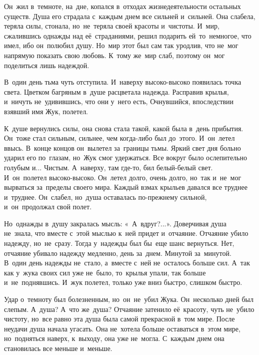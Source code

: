Он~жил в~темноте, на~дне, копался в~отходах жизнедеятельности остальных существ.
Душа его страдала с~каждым днем все сильней и~сильней.
Она слабела, теряла силы, стонала, но~не~теряла своей красоты и~чистоты.
И~мир, сжалившись однажды над её~страданиями, решил подарить ей~то~немногое, что имел, ибо он~полюбил душу.
Но~мир этот был сам так уродлив, что не~мог напрямую показать свою любовь.
К~тому же~мир слаб, поэтому он~мог поделиться лишь надеждой.

В~один день тьма чуть отступила.
И~наверху высоко-высоко появилась точка света.
Цветком багряным в~душе расцветала надежда.
Расправив крылья, и~ничуть не~удивившись, что они у~него есть, Очнувшийся, впоследствии взявший имя Жук, полетел.
 
К~душе вернулись силы, она снова стала такой, какой была в~день прибытия.
Он~тоже стал сильным, сильнее, чем когда-либо был до~этого.
И~он~летел ввысь.
В~конце концов он~вылетел за~границы тьмы.
Яркий свет дня больно ударил его по~глазам, но~Жук смог удержаться.
Все вокруг было ослепительно голубым и...
Чистым.
А~наверху, там где-то, бил белый-белый свет.
И~он~полетел высоко-высоко.
Он~летел долго, очень долго, но~так и~не~мог вырваться за~пределы своего мира.
Каждый взмах крыльев давался все труднее и~труднее.
Он~слабел, но~душа оставалась по-прежнему сильной, и~он~продолжал свой полет.
 
Но~однажды в~душу закралась мысль: «~А~вдруг?...».
Доверчивая душа не~знала, что вместе с~этой мыслью к~ней придет и~отчаяние.
Отчаяние убило надежду, но~не~сразу.
Тогда у~надежды был бы~еще шанс вернуться.
Нет, отчаяние убивало надежду медленно, день за~днем.
Минутой за~минутой.
В~один день надежды не~стало, а~вместе с~ней не~осталось больше сил.
А~так как у~жука своих сил уже не~было, то~крылья упали, так больше и~не~поднявшись.
И~жук полетел, только уже вниз быстро, слишком быстро.
 
Удар о~темноту был болезненным, но~он~не~убил Жука.
Он~несколько дней был слепым.
А~душа? А~что же~душа? Отчаяние затенило её~красоту, чуть не~убило чистоту, но~все равно эта душа была самой прекрасной в~том мире.
После неудачи душа начала угасать.
Она не~хотела больше оставаться в~этом мире, но~подняться наверх, к~выходу, она уже не~могла.
С~каждым днем она становилась все меньше и~меньше.
 
